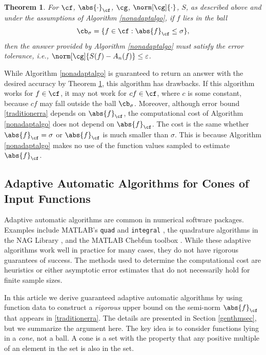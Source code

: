 \documentclass[]{elsarticle}
\newtheorem{theorem}{Theorem}
\theoremstyle{definition}
\theoremstyle{remark}
\newcommand{\Fnorm}[1]{\abs{#1}_{\cf}}
\newcommand{\Gnorm}[1]{\norm[\cg]{#1}}
\begin{document}
\begin{theorem}  \label{NonAdaptDetermThm}  For $\cf$, $\Fnorm{\cdot}$, $\cg$, $\Gnorm{\cdot}$, $S$, as described above and under the assumptions of Algorithm \ref{nonadaptalgo}, if $f$ lies in the {\em ball} 
\begin{equation} 
\cb_\sigma=\{ f \in \cf : \Fnorm{f} \le \sigma\}, \label{balldef}
\end{equation}
then the answer provided by Algorithm \ref{nonadaptalgo} must satisfy the error tolerance, i.e., $\norm[\cg]{S(f)-A_n(f)} \le \varepsilon$.
\end{theorem}

While Algorithm \ref{nonadaptalgo} is guaranteed to return an answer with the desired accuracy by Theorem \ref{NonAdaptDetermThm}, this algorithm has drawbacks.  If this algorithm works for $f \in \cf$, it may not work for $cf \in \cf$, where $c$ is some constant, because $cf$ may fall outside the ball $\cb_\sigma$.  Moreover, although error bound \eqref{traditionerra} depends on $\Fnorm{f}$, the computational cost of Algorithm \ref{nonadaptalgo} does not depend on $\Fnorm{f}$.  The cost is the same whether $\Fnorm{f}=\sigma$ or $\Fnorm{f}$ is much smaller than $\sigma$.  This is because Algorithm \ref{nonadaptalgo} makes no use of the function values sampled to estimate $\Fnorm{f}$.

\subsection{Adaptive Automatic Algorithms for Cones of Input Functions} \label{adapintrosec}

Adaptive automatic algorithms are common in numerical software packages.  Examples include  MATLAB's {\tt quad} and {\tt integral} \cite{MAT8.1}, the quadrature algorithms in the NAG Library \cite{NAG23}, and the MATLAB Chebfun toolbox \cite{TrefEtal12}.  While these adaptive algorithms work well in practice for many cases, they do not have rigorous guarantees of success. The methods used to determine the computational cost are heuristics or either asymptotic error estimates that do not necessarily hold for finite sample sizes.

In this article we derive guaranteed adaptive automatic algorithms by using function data to construct a \emph{rigorous} upper bound on the semi-norm $\Fnorm{f}$ that appears in \eqref{traditionerra}.  The details are presented in Section \ref{genthmsec}, but we summarize the argument here.  The key idea is to consider functions lying in a \emph{cone}, not a ball.  A cone is a set with the property that any positive multiple of an element in the set is also in the set.
\end{document}
